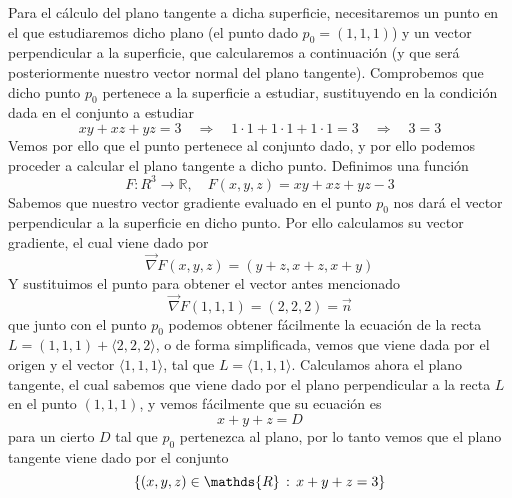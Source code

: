 \documentclass[fleqn]{article}
\def\R{\mathds{R}}
\begin{document}
        Para el cálculo del plano tangente a dicha superficie, necesitaremos un punto en el que estudiaremos dicho plano
        (el punto dado $p_0=(1,1,1)$) y un vector perpendicular a la superficie, que calcularemos a continuación (y que será posteriormente nuestro 
        vector normal del plano tangente). Comprobemos que dicho punto $p_0$ pertenece a la superficie a estudiar, sustituyendo en la condición dada
        en el conjunto a estudiar
        $$xy + xz + yz = 3 \quad \Rightarrow \quad 1\cdot 1 + 1\cdot 1 + 1\cdot 1 = 3 \quad \Rightarrow \quad 3=3$$
        Vemos por ello que el punto pertenece al conjunto dado, y por ello podemos proceder a calcular el plano tangente a dicho punto. Definimos 
        una función 
        $$F:R^3 \longrightarrow \R, \quad F(x,y,z)= xy + xz + yz - 3$$
        Sabemos que nuestro vector gradiente evaluado en el punto $p_0$ nos dará el vector perpendicular a la superficie en dicho punto. Por ello 
        calculamos su vector gradiente, el cual viene dado por 
        $$\vec{\nabla} F(x,y,z)= (y+z,x+z,x+y)$$
        Y sustituimos el punto para obtener el vector antes mencionado
        $$\vec{\nabla} F(1,1,1)= (2,2,2) = \vec{n}$$
        que junto con el punto $p_0$ podemos obtener fácilmente la ecuación de la recta $L=(1,1,1) + \langle 2,2,2\rangle$, o de forma simplificada, 
        vemos que viene dada por el origen y el vector $\langle 1,1,1 \rangle$, tal que $L=\langle 1,1,1 \rangle$. Calculamos ahora el plano tangente,
        el cual sabemos que viene dado por el plano perpendicular a la recta $L$ en el punto $(1,1,1)$, y vemos fácilmente que su ecuación es
        $$x+y+z=D$$
        para un cierto $D$ tal que $p_0$ pertenezca al plano, por lo tanto vemos que el plano tangente viene dado por el conjunto
        $$\{(x,y,z)\in \R \thinspace : \thinspace x+y+z=3\}$$
\end{document}
